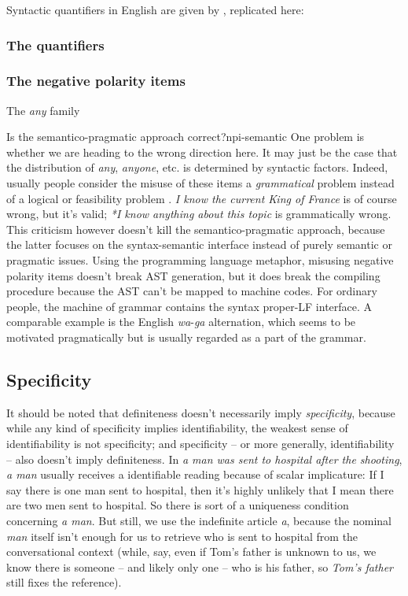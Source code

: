 \documentclass[UTF8, a4paper, oneside, scheme=plain]{ctexrep}
\newcommand*{\citepage}[1]{p.~{#1}}
\newcommand{\corpus}[1]{\emph{#1}}
\begin{document}
Syntactic quantifiers in English are given by \citet[\citepage{361}, {[9]}]{cgel},
replicated here:

\subsubsection{The quantifiers}

\subsubsection{The negative polarity items}

The \corpus{any} family

\begin{theorybox}{Is the semantico-pragmatic approach correct?}{npi-semantic}
    One problem is whether we are heading to the wrong direction here.
    It may just be the case that the distribution of \corpus{any}, \corpus{anyone}, etc. 
    is determined by syntactic factors.
    Indeed, usually people consider the misuse of these items 
    a \emph{grammatical} problem 
    instead of a logical or feasibility problem
    \citep[\citepage{812}]{zeijlstra2013}.
    \corpus{I know the current King of France} is of course wrong,
    but it's valid;
    \corpus{*I know anything about this topic} is grammatically wrong.
    This criticism however doesn't kill the semantico-pragmatic approach,
    because the latter focuses on the syntax-semantic interface 
    instead of purely semantic or pragmatic issues.
    Using the programming language metaphor,
    misusing negative polarity items doesn't break AST generation,
    but it does break the compiling procedure
    because the AST can't be mapped to machine codes.
    For ordinary people, the machine of grammar contains the syntax proper-LF interface.
    A comparable example is the English \corpus{wa}-\corpus{ga} alternation,
    which seems to be motivated pragmatically 
    but is usually regarded as a part of the grammar.
\end{theorybox}

\subsection{Specificity}\label{sec:np.det.specific}

It should be noted that definiteness doesn't necessarily imply \emph{specificity},
because while any kind of specificity implies identifiability, 
the weakest sense of identifiability 
is not specificity;
and specificity -- or more generally, identifiability -- 
also doesn't imply definiteness.
In \corpus{a man was sent to hospital after the shooting}, 
\corpus{a man} usually receives a identifiable reading 
because of scalar implicature: 
If I say there is one man sent to hospital,
then it's highly unlikely that I mean there are two men sent to hospital.
So there is sort of a uniqueness condition concerning \corpus{a man}.
But still, we use the indefinite article \corpus{a},
because the nominal \corpus{man} itself 
isn't enough for us to retrieve who is sent to hospital from the conversational context
(while, say, even if Tom's father is unknown to us,
we know there is someone -- and likely only one -- who is his father,
so \corpus{Tom's father} still fixes the reference).
\end{document}

